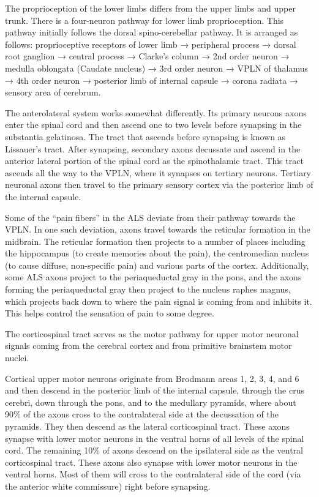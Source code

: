The proprioception of the lower limbs differs from the upper limbs and upper trunk. There is a four-neuron pathway for lower limb proprioception. This pathway initially follows the dorsal spino-cerebellar pathway. It is arranged as follows: proprioceptive receptors of lower limb → peripheral process → dorsal root ganglion → central process → Clarke's column → 2nd order neuron → medulla oblongata (Caudate nucleus) → 3rd order neuron → VPLN of thalamus → 4th order neuron → posterior limb of internal capsule → corona radiata → sensory area of cerebrum.

The anterolateral system works somewhat differently. Its primary neurons axons enter the spinal cord and then ascend one to two levels before synapsing in the substantia gelatinosa. The tract that ascends before synapsing is known as Lissauer's tract. After synapsing, secondary axons decussate and ascend in the anterior lateral portion of the spinal cord as the spinothalamic tract. This tract ascends all the way to the VPLN, where it synapses on tertiary neurons. Tertiary neuronal axons then travel to the primary sensory cortex via the posterior limb of the internal capsule.

Some of the ``pain fibers'' in the ALS deviate from their pathway towards the VPLN. In one such deviation, axons travel towards the reticular formation in the midbrain. The reticular formation then projects to a number of places including the hippocampus (to create memories about the pain), the centromedian nucleus (to cause diffuse, non-specific pain) and various parts of the cortex. Additionally, some ALS axons project to the periaqueductal gray in the pons, and the axons forming the periaqueductal gray then project to the nucleus raphes magnus, which projects back down to where the pain signal is coming from and inhibits it. This helps control the sensation of pain to some degree.

The corticospinal tract serves as the motor pathway for upper motor neuronal signals coming from the cerebral cortex and from primitive brainstem motor nuclei.

Cortical upper motor neurons originate from Brodmann areas 1, 2, 3, 4, and 6 and then descend in the posterior limb of the internal capsule, through the crus cerebri, down through the pons, and to the medullary pyramids, where about 90\% of the axons cross to the contralateral side at the decussation of the pyramids. They then descend as the lateral corticospinal tract. These axons synapse with lower motor neurons in the ventral horns of all levels of the spinal cord. The remaining 10\% of axons descend on the ipsilateral side as the ventral corticospinal tract. These axons also synapse with lower motor neurons in the ventral horns. Most of them will cross to the contralateral side of the cord (via the anterior white commissure) right before synapsing.

